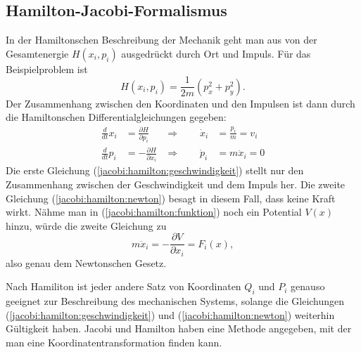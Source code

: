 \subsection{Hamilton-Jacobi-Formalismus}
In der Hamiltonschen Beschreibung der Mechanik geht man aus von
der Gesamtenergie $H(x_i, p_i)$ ausgedrückt durch Ort und Impuls.
Für das Beispielproblem ist
\begin{equation}
H(x_i,p_i)=\frac1{2m}(p_x^2+p_y^2).
\label{jacobi:hamilton:funktion}
\end{equation}
Der Zusammenhang zwischen den Koordinaten und den Impulsen ist dann
durch die Hamiltonschen Differentialgleichungen gegeben:
\begin{align}
\frac{d}{dt}x_i&=\frac{\partial H}{\partial p_i}
&\Rightarrow
\qquad \dot x_i&=\frac{p_i}{m}=v_i
\label{jacobi:hamilton:geschwindigkeit}
\\
\frac{d}{dt}p_i&=-\frac{\partial H}{\partial x_i}
&\Rightarrow
\qquad
\dot p_i&=m\ddot x_i=0
\label{jacobi:hamilton:newton}
\end{align}
Die erste Gleichung (\ref{jacobi:hamilton:geschwindigkeit}) stellt
nur den Zusammenhang zwischen der Geschwindigkeit und dem Impuls
her. Die zweite Gleichung (\ref{jacobi:hamilton:newton}) besagt in
diesem Fall, dass keine Kraft wirkt. Nähme man in 
(\ref{jacobi:hamilton:funktion}) noch ein Potential $V(x)$ hinzu,
würde die zweite Gleichung zu
\[
m\ddot x_i=-\frac{\partial V}{\partial x_i} = F_i(x),
\]
also genau dem Newtonschen Gesetz.

Nach Hamiliton ist jeder andere Satz von Koordinaten $Q_i$ und $P_i$
genauso geeignet zur Beschreibung des mechanischen Systems, solange die
Gleichungen 
(\ref{jacobi:hamilton:geschwindigkeit}) und (\ref{jacobi:hamilton:newton})
weiterhin Gültigkeit haben. Jacobi und Hamilton haben eine Methode
angegeben, mit der man eine Koordinatentransformation finden kann.

